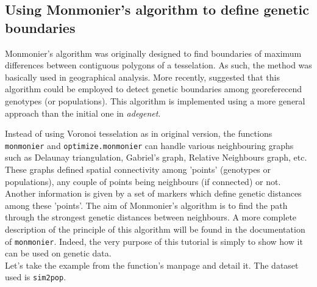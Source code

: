 \documentclass{article}
\begin{document}
\subsection{Using Monmonier's algorithm to define genetic boundaries}
Monmonier's algorithm \cite{tj433} was originally designed to find boundaries of maximum differences between contiguous polygons of a tesselation.
As such, the method was basically used in geographical analysis.
More recently, \cite{np120} suggested that this algorithm could be employed to detect genetic boundaries among georeferecend genotypes (or populations).
This algorithm is implemented using a more general approach than the initial one in \textit{adegenet}.

Instead of using Voronoi tesselation as in original version, the functions \texttt{monmonier} and \texttt{optimize.monmonier} can handle various neighbouring graphs such as Delaunay triangulation, Gabriel's graph, Relative Neighbours graph, etc.
These graphs defined spatial connectivity among 'points' (genotypes or populations), any couple of points being neighbours (if connected) or not.
Another information is given by a set of markers which define genetic distances among these 'points'.
The aim of Monmonier's algorithm is to find the path through the strongest genetic distances between neighbours.
A more complete description of the principle of this algorithm will be found in the documentation of \texttt{monmonier}.
Indeed, the very purpose of this tutorial is simply to show how it can be used on genetic data.
\\

Let's take the example from the function's manpage and detail it.
The dataset used is \texttt{sim2pop}.
\end{document}
